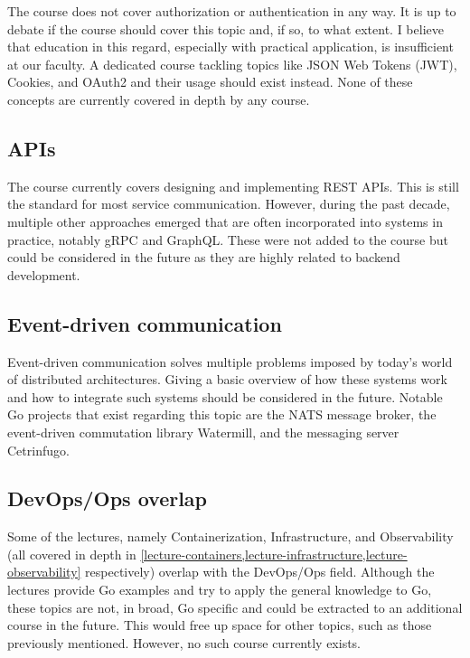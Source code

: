 \documentclass[
  digital,
  color,
  oneside,
  nosansbold,
  nocolorbold,
  nolof,
  nolot,
]{fithesis4}
\begin{document}
The course does not cover authorization or authentication in any way. It is up to debate if the course should cover this topic and, if so, to what extent. I believe that education in this regard, especially with practical application, is insufficient at our faculty. A dedicated course tackling topics like JSON Web Tokens (JWT)\cite{jwt}, Cookies, and OAuth2\cite{oauth2} and their usage should exist instead. None of these concepts are currently covered in depth by any course.

\subsection{APIs}

The course currently covers designing and implementing REST APIs. This is still the standard for most service communication. However, during the past decade, multiple other approaches emerged that are often incorporated into systems in practice, notably gRPC\cite{grpc} and GraphQL\cite{graphql}. These were not added to the course but could be considered in the future as they are highly related to backend development.

\subsection{Event-driven communication}\label{edc}

Event-driven communication solves multiple problems imposed by today's world of distributed architectures. Giving a basic overview of how these systems work and how to integrate such systems should be considered in the future. Notable Go projects that exist regarding this topic are the NATS\cite{nats} message broker, the event-driven commutation library Watermill\cite{watermill}, and the messaging server Cetrinfugo\cite{centrifugo}.

\subsection{DevOps/Ops overlap}\label{devops-overlap}

Some of the lectures, namely Containerization, Infrastructure, and Observability (all covered in depth in \cref{lecture-containers,lecture-infrastructure,lecture-observability} respectively) overlap with the DevOps/Ops field. Although the lectures provide Go examples and try to apply the general knowledge to Go, these topics are not, in broad, Go specific and could be extracted to an additional course in the future. This would free up space for other topics, such as those previously mentioned. However, no such course currently exists.
\end{document}
